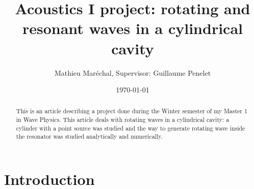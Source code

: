 \documentclass[%
 reprint,
 amsmath,amssymb,
 aps,
]{revtex4-2}
\begin{document}

\title{Acoustics I project: rotating and resonant waves in a cylindrical cavity}
\author{Mathieu Maréchal, Supervisor: Guillaume Penelet}
%

\date{\today}
\begin{abstract}
    This is an article describing a project done during the Winter semester of my Master 1 in Wave Physics. This article deals with rotating waves in a cylindrical cavity: a cylinder with a point source was studied and the way to generate rotating wave inside the resonator was studied analytically and numerically.
\end{abstract}

\maketitle


\section{Introduction}

\end{document}
